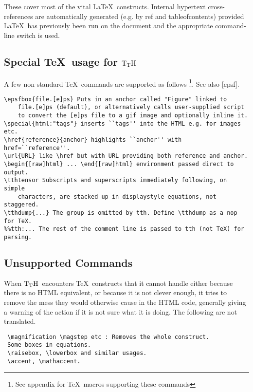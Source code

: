 \documentclass[12pt]{article}
\def\tthdump{}
\def\TtH{$\rm{}T_TH$}
\begin{document}
 These cover most of the vital \LaTeX\ constructs.  Internal hypertext
cross-references are automatically generated (e.g. by ref and
tableofcontents) provided \LaTeX\ has previously been run on the
document and the appropriate command-line switch is used.

\subsection{Special \TeX\ usage for \TtH}
 A few non-standard \TeX\ commands are supported as follows
\footnote{See appendix for \TeX\ macros supporting these commands}. See
also \ref{epsf}.
 {\begin{verbatim}
\epsfbox{file.[e]ps} Puts in an anchor called "Figure" linked to 
    file.[e]ps (default), or alternatively calls user-supplied script 
    to convert the [e]ps file to a gif image and optionally inline it.  
\special{html:"tags"} inserts ``tags'' into the HTML e.g. for images etc.  
\href{reference}{anchor} highlights ``anchor'' with href=``reference''.
\url{URL} like \href but with URL providing both reference and anchor.
\begin{[raw]html} ... \end{[raw]html} environment passed direct to output.
\tthtensor Subscripts and superscripts immediately following, on simple
    characters, are stacked up in displaystyle equations, not staggered. 
\tthdump{...} The group is omitted by tth. Define \tthdump as a nop for TeX.
%%tth:... The rest of the comment line is passed to tth (not TeX) for parsing.
\end{verbatim} }


\subsection{Unsupported Commands}

 When \TtH\ encounters \TeX\ constructs that it cannot handle either
because there is no HTML equivalent, or because it is not clever
enough, it tries to remove the mess they would otherwise cause in the
HTML code, generally giving a warning of the action if it is not sure
what it is doing. The following are
not translated.

{\begin{verbatim}
 \magnification \magstep etc : Removes the whole construct.
 Some boxes in equations.
 \raisebox, \lowerbox and similar usages.
 \accent, \mathaccent. 
\end{verbatim} }
\end{document}
